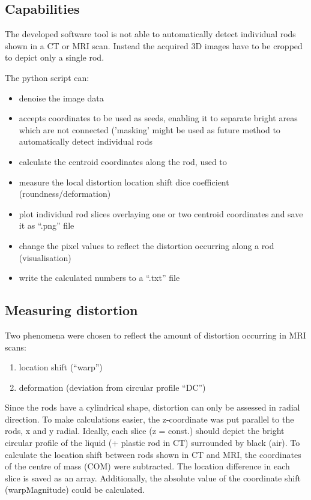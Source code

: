 \subsection{Capabilities}

The developed software tool is not able to automatically detect individual rods shown in a CT or MRI scan.
Instead the acquired 3D images have to be cropped to depict only a single rod.

The python script can:
\begin{itemize}
 \item denoise the image data
 \item accepts coordinates to be used as seeds, enabling it to separate bright areas which are not connected ('masking' might be used as future method to automatically detect individual rods
 \item calculate the centroid coordinates along the rod, used to
 \item measure the local distortion
  \subitem location shift
  \subitem dice coefficient (roundness/deformation)
 \item plot individual rod slices
  \subitem overlaying one or two centroid coordinates
  \subitem and save it as ``.png'' file
 \item change the pixel values to reflect the distortion occurring along a rod (visualisation)
 \item write the calculated numbers to a ``.txt'' file
\end{itemize}

\subsection{Measuring distortion}

Two phenomena were chosen to reflect the amount of distortion occurring in MRI scans:

\begin{enumerate}[label=\textbf{\arabic*)}]
 \item location shift (``warp'')
 \item deformation (deviation from circular profile ``DC'')
\end{enumerate}

Since the rods have a cylindrical shape, distortion can only be assessed in radial direction.
To make calculations easier, the z-coordinate was put parallel to the rods, x and y radial.
Ideally, each slice (z = const.) should depict the bright circular profile of the liquid (+ plastic rod in CT) surrounded by black (air).
To calculate the location shift between rods shown in CT and MRI, the coordinates of the centre of mass (COM) were subtracted.
The location difference in each slice is saved as an array.
Additionally, the absolute value of the coordinate shift (warpMagnitude) could be calculated.

